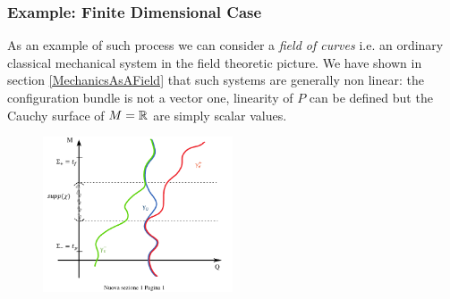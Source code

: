 \documentclass[Main]{subfiles}
\begin{document}
	\subsubsection{Example: Finite Dimensional Case} 
		As an example of such process we can consider a \emph{field of curves} i.e. an ordinary classical mechanical system in the field theoretic picture.
		We have shown in section \ref{MechanicsAsAField} that such systems are generally non linear: the configuration bundle is not a vector one, linearity of $P$ can be defined but the Cauchy surface of $M=\mathbb{R}$ are simply scalar values.

	 		\begin{figure}[h!]
				  \centering
   			\includegraphics[width=0.5\textwidth]{Pictures/AdvRetSol} 
   	  		\caption{}
		\end{figure}		
	 
	
	
	
\newpage

	\danger \danger \danger \danger 	\danger \danger \danger \danger 	\danger \danger \danger \danger 
\end{document}
